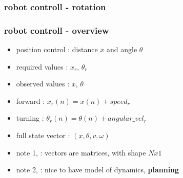 \documentclass{beamer}
\begin{document}
\begin{frame}
  
  \frametitle{\bf robot controll - rotation}


\end{frame}


\begin{frame}
  \frametitle{\bf robot controll - overview}

  \begin{itemize}
    \item position control : distance $x$ and angle $\theta$
    \item required values : $x_r$, $\theta_r$
    \item observed values : $x$, $\theta$ 
    \item forward  : $x_r(n) = x(n) + speed_{r}$
    \item turning  : $\theta_r(n) = \theta(n) + angular\_vel_{r}$
    \item full state vector : $(x, \theta, v, \omega)$
    \item note 1, : vectors are matrices, with shape $N x 1$
    \item note 2, : nice to have model of dynamics, \bf{planning}
  \end{itemize}

\end{frame}
\end{document}
